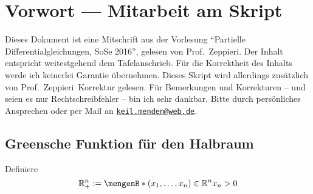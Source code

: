 \newcommand{\Semester}{SoSe 2016}
\newcommand{\fach}{Partielle Differentialgleichungen}
\newcommand{\prof}{Prof.\ Zeppieri}






\maketitle
\cleardoubleoddemptypage

\section*{Vorwort --- Mitarbeit am Skript}
Dieses Dokument ist eine Mitschrift aus der Vorlesung \enquote{\fach, \Semester}, gelesen von \prof. 
Der Inhalt entspricht weitestgehend dem Tafelanschrieb. 
Für die Korrektheit des Inhalts werde ich keinerlei Garantie übernehmen. Dieses Skript wird allerdings zusätzlich von \prof \, Korrektur gelesen. 
Für Bemerkungen und Korrekturen -- und seien es nur Rechtschreibfehler -- bin ich sehr dankbar. 
Bitte durch persönliches Ansprechen oder per Mail an \href{mailto:keil.menden@web.de}{\nolinkurl{keil.menden@web.de}}.  

\newpage

\tableofcontents
\cleardoubleoddemptypage
{}
\setcounter{page}{1}











\subsection*{Greensche Funktion für den Halbraum} 
\label{sec:section_name}
Definiere 
\[
	\mathbb{R}^n_+ := \set[(x_1,\dots,x_n) \in \mathbb{R}^n]{x_n > 0}
\]

